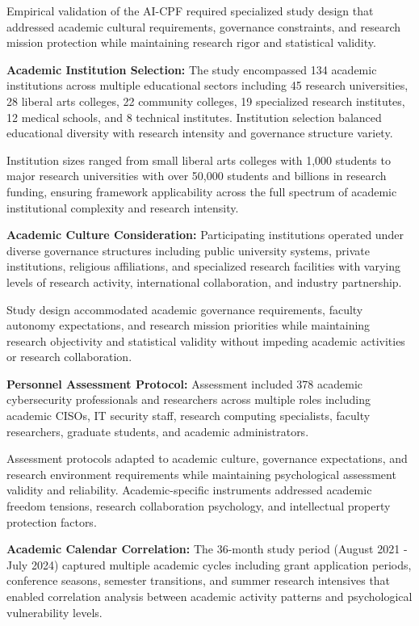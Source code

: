 \documentclass[10pt, twocolumn]{article}
\begin{document}
Empirical validation of the AI-CPF required specialized study design that addressed academic cultural requirements, governance constraints, and research mission protection while maintaining research rigor and statistical validity.

\textbf{Academic Institution Selection:} The study encompassed 134 academic institutions across multiple educational sectors including 45 research universities, 28 liberal arts colleges, 22 community colleges, 19 specialized research institutes, 12 medical schools, and 8 technical institutes. Institution selection balanced educational diversity with research intensity and governance structure variety.

Institution sizes ranged from small liberal arts colleges with 1,000 students to major research universities with over 50,000 students and billions in research funding, ensuring framework applicability across the full spectrum of academic institutional complexity and research intensity.

\textbf{Academic Culture Consideration:} Participating institutions operated under diverse governance structures including public university systems, private institutions, religious affiliations, and specialized research facilities with varying levels of research activity, international collaboration, and industry partnership.

Study design accommodated academic governance requirements, faculty autonomy expectations, and research mission priorities while maintaining research objectivity and statistical validity without impeding academic activities or research collaboration.

\textbf{Personnel Assessment Protocol:} Assessment included 378 academic cybersecurity professionals and researchers across multiple roles including academic CISOs, IT security staff, research computing specialists, faculty researchers, graduate students, and academic administrators.

Assessment protocols adapted to academic culture, governance expectations, and research environment requirements while maintaining psychological assessment validity and reliability. Academic-specific instruments addressed academic freedom tensions, research collaboration psychology, and intellectual property protection factors.

\textbf{Academic Calendar Correlation:} The 36-month study period (August 2021 - July 2024) captured multiple academic cycles including grant application periods, conference seasons, semester transitions, and summer research intensives that enabled correlation analysis between academic activity patterns and psychological vulnerability levels.
\end{document}

